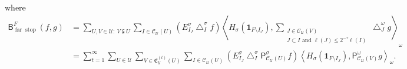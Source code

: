 \documentclass{amsart}%
\theoremstyle{plain}
\numberwithin{equation}{section}
\begin{document}
where%
\begin{align*}
\mathsf{B}_{\operatorname{far}\operatorname*{stop}}^{F}\left(  f,g\right)   &
=\sum_{U,V\in\mathcal{U}:\ V\subsetneqq U}\sum_{I\in\mathcal{C}_{\mathcal{U}%
}\left(  U\right)  }\left(  E_{I_{J}}^{\sigma}\bigtriangleup_{I}^{\sigma
}f\right)  \left\langle H_{\sigma}\left(  \mathbf{1}_{F\setminus I_{J}%
}\right)  ,\sum_{\substack{J\in\mathcal{C}_{\mathcal{U}}\left(  V\right)
\\J\subset I\text{ and }\ell\left(  J\right)  \leq2^{-\tau}\ell\left(
I\right)  }}\bigtriangleup_{J}^{\omega}g\right\rangle _{\omega}\\
& =\sum_{t=1}^{\infty}\sum_{U\in\mathcal{U}}\sum_{V\in\mathfrak{C}%
_{\mathcal{U}}^{\left(  t\right)  }\left(  U\right)  }\sum_{I\in
\mathcal{C}_{\mathcal{U}}\left(  U\right)  }\left(  E_{I_{J}}^{\sigma
}\bigtriangleup_{I}^{\sigma}\mathsf{P}_{\mathcal{C}_{\mathcal{U}}\left(
U\right)  }^{\sigma}f\right)  \left\langle H_{\sigma}\left(  \mathbf{1}%
_{F\setminus I_{J}}\right)  ,\mathsf{P}_{\mathcal{C}_{\mathcal{U}}\left(
V\right)  }^{\omega}g\right\rangle _{\omega}.
\end{align*}
\end{document}
